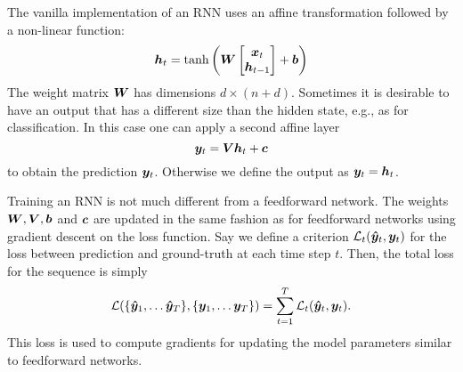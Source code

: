 		The vanilla implementation of an RNN uses an affine transformation followed by a non-linear function:
		\begin{equation}
			\bm{h}_t = 
			\tanh \left(
			\bm{W}
			\begin{bmatrix}
				\bm{x}_t \\
				\bm{h}_{t-1}
			\end{bmatrix}
			+ \bm{b}
			\right)
		\end{equation}
		The weight matrix $\bm{W}$ has dimensions $d \times (n + d)$.
		Sometimes it is desirable to have an output that has a different size than the hidden state, e.g., as for classification.
		In this case one can apply a second affine layer
		\begin{equation}
			\bm{y}_t = \bm{V} \bm{h}_t + \bm{c}
		\end{equation}
		to obtain the prediction $\bm{y}_t$.
		Otherwise we define the output as $\bm{y}_t = \bm{h}_t$.
		
		Training an RNN is not much different from a feedforward network.
		The weights $\bm{W}, \bm{V}, \bm{b}$ and $\bm{c}$ are updated in the same fashion as for feedforward networks using gradient descent on the loss function.
		Say we define a criterion $\mathcal{L}_t(\bm{\hat{y}}_t, \bm{y}_t)$ for the loss between prediction and ground-truth at each time step $t$.
		Then, the total loss for the sequence is simply 
		\begin{equation}\label{eq:loss_for_rnn}
			\mathcal{L}(\{\vectr{\hat{y}}_1, \dots \vectr{\hat{y}}_T\}, \{\vectr{y}_1, \dots \vectr{y}_T\}) = 
			\sum_{t=1}^{T} \mathcal{L}_t(\vectr{\hat{y}}_t, \vectr{y}_t).
		\end{equation}
		This loss is used to compute gradients for updating the model parameters similar to feedforward networks.
		
